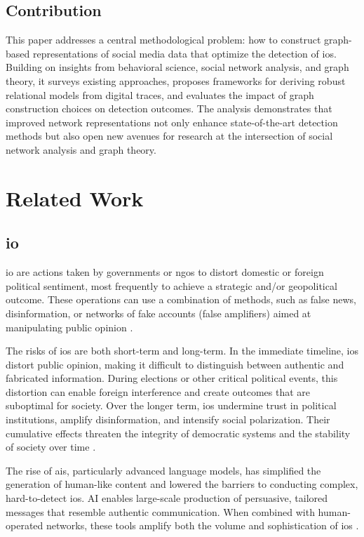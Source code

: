 \documentclass{article}
\begin{document}
\subsection{Contribution}
This paper addresses a central methodological problem: how to construct graph-based representations of social media data that optimize the detection of \acp{io}. Building on insights from behavioral science, social network analysis, and graph theory, it surveys existing approaches, proposes frameworks for deriving robust relational models from digital traces, and evaluates the impact of graph construction choices on detection outcomes. The analysis demonstrates that improved network representations not only enhance state-of-the-art detection methods but also open new avenues for research at the intersection of social network analysis and graph theory.

\section{Related Work}

\subsection{\Acl{io}}

\Acl{io} are actions taken by governments or \acp{ngo} to distort domestic or foreign political sentiment, most frequently to achieve a strategic and/or geopolitical outcome. These operations can use a combination of methods, such as false news, disinformation, or networks of fake accounts (false amplifiers) aimed at manipulating public opinion \cite{weedon2017information}.

The risks of \acp{io} are both short-term and long-term. In the immediate timeline, \acp{io} distort public opinion, making it difficult to distinguish between authentic and fabricated information. During elections or other critical political events, this distortion can enable foreign interference and create outcomes that are suboptimal for society. Over the longer term, \acp{io} undermine trust in political institutions, amplify disinformation, and intensify social polarization. Their cumulative effects threaten the integrity of democratic systems and the stability of society over time \cite{weedon2017information}.

The rise of \acp{ai}, particularly advanced language models, has simplified the generation of human-like content and lowered the barriers to conducting complex, hard-to-detect \acp{io}. AI enables large-scale production of persuasive, tailored messages that resemble authentic communication. When combined with human-operated networks, these tools amplify both the volume and sophistication of \acp{io} \cite{fredheim2024assessing}. 
\end{document}
